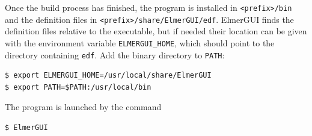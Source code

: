 

Once the build process has finished, the program is installed in {\tt <prefix>/bin} and the
definition files in {\tt <prefix>/share/ElmerGUI/edf}. ElmerGUI finds the definition files
relative to the executable, but if needed their location can be given with the environment
variable {\tt ELMERGUI\_HOME}, which should point to the directory containing {\tt edf}.
Add the binary directory to {\tt PATH}:
\begin{verbatim}
$ export ELMERGUI_HOME=/usr/local/share/ElmerGUI
$ export PATH=$PATH:/usr/local/bin
\end{verbatim}
The program is launched by the command
\begin{verbatim}
$ ElmerGUI
\end{verbatim}






